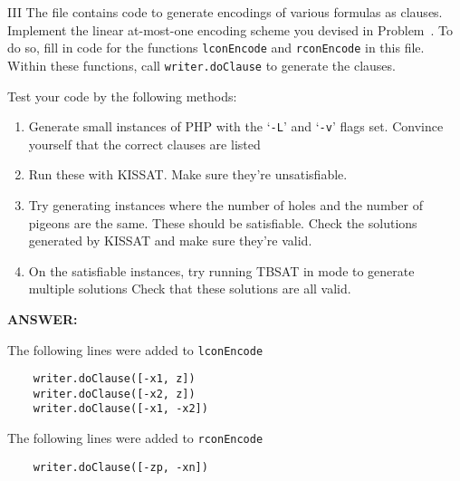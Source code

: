 \snewpage

\begin{problem}{III}
The file
 contains code
to generate encodings of various formulas as clauses.
Implement the linear at-most-one encoding scheme you devised in
Problem~.  To do so, fill in code for the functions
\texttt{lconEncode} and \texttt{rconEncode} in this file.
Within these functions, call
\texttt{writer.doClause} to generate the clauses.

Test your code by the following methods:
\begin{enumerate}
\item
Generate small instances of PHP with the `\texttt{-L}' and
`\texttt{-v}' flags set.  Convince yourself that the correct clauses are listed
\item
  Run these with KISSAT. Make sure they're unsatisfiable.
\item
  Try generating instances where the number of holes and the number of
  pigeons are the same.  These should be satisfiable.  Check the
  solutions generated by KISSAT and make sure they're valid.
\item
  On the satisfiable instances, try running TBSAT in mode to generate multiple solutions
  Check that these solutions are all valid.
\end{enumerate}
\ifshowsolutions
{\bf ANSWER:}

The following lines were added to \texttt{lconEncode}
\begin{lstlisting}
    writer.doClause([-x1, z])
    writer.doClause([-x2, z])
    writer.doClause([-x1, -x2])
\end{lstlisting}
The following lines were added to \texttt{rconEncode}
\begin{lstlisting}
    writer.doClause([-zp, -xn])
\end{lstlisting}
\fi

\end{problem}

\newpage

